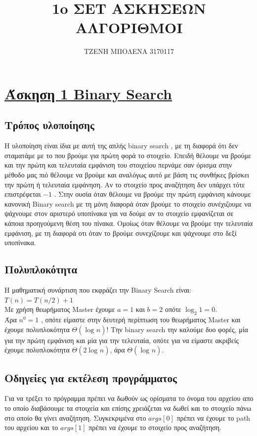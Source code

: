 \documentclass[12pt]{article}
\title{1o ΣΕΤ ΑΣΚΗΣΕΩΝ \\ ΑΛΓΟΡΙΘΜΟΙ}
\author{ΤΖΕΝΗ ΜΠΟΛΕΝΑ 3170117}
\date{}
\begin{document}
	
\maketitle
	
  \section{\underline{Άσκηση 1 Binary Search}}
  \subsection{Τρόπος υλοποίησης}
  Η υλοποίηση είναι ίδια με αυτή της απλής binary search , με τη διαφορά ότι δεν σταματάμε με το που βρούμε για πρώτη φορά το στοιχείο. Επειδή θέλουμε να βρούμε και την πρώτη και τελευταία εμφάνιση του στοιχείου περνάμε σαν όρισμα στην μέθοδο μας πιό θέλουμε να βρούμε και αναλόγως αυτό με βάση τις συνθήκες βρίσκει την πρώτη ή τελευταία εμφάνηση. Αν το στοιχείο προς αναζήτηση δεν υπάρχει τότε επιστρέφεται $-1$ .  Στην ουσία όταν θέλουμε να βρούμε την πρώτη εμφάνιση κάνουμε κανονική Binary search με τη μόνη διαφορά όταν βρούμε το στοιχείο συνέχιζουμε να ψάχνουμε στον αριστερό υποπίνακα γαι να δούμε αν το στοιχείο εμφανίζεται σε κάποια προηγούμενη θέση του πίνακα. Ομοίως όταν θέλουμε να βρούμε την τελευταία εμφάνιση, με τη διαφορά οτι όταν το βρούμε συνεχίζουμε και ψάχνουμε στο δεξί υποπίνακα.
  
  \subsection{Πολυπλοκότητα}
  Η μαθηματική συνάρτιση που εκφράζει την Binary Search είναι: \\ $T(n) = T(n/2) + 1$ \\
  Με χρήση θεωρήματος Master έχουμε $ a=1$ και $b=2$ οπότε $\log_{2}1 = 0$. \\ Άρα $n^0 = 1$ , οπότε είμαστε στην δευτερή περίπτωση του θεωρήματος Master και έχουμε πολυπλοκότητα  $\Theta(\log_{}n)$! Την binary search την καλούμε δυο φορές, μία για την πρώτη εμφάνιση και μία για την τελευταία, οπότε για  να είμαστε ακριβείς έχουμε πολυπλοκότητα $\Theta(2\log_{}n)$, άρα $\Theta(\log_{}n)$.
  
  \subsection{Οδηγείες για εκτέλεση προγράμματος}
  Για να τρέξει το πρόγραμμα πρέπει να δωθούν ως ορίσματα το όνομα του αρχείου απο το οποίο διαβάσουμε τα στοιχεία και επίσης χρειάζεται να δωθεί και το στοιχείο πάνω στο οποίο θα γίνει αναζήτηση. Συγκεκριμένα στο $args[0]$ πρέπει να έχουμε το path του αρχείου και το $args[1]$ πρέπει να έχουμε το στοιχείο προς αναζήτηση.
  \\ \\ \\
   
\end{document}

